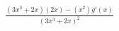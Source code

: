 \documentclass[preview]{standalone}
\begin{document}
\begin{align*}
\frac{(3x^3+2x)(2x)-(x^2)g'(x)}{(3x^3+2x)^2}
\end{align*}
\end{document}
